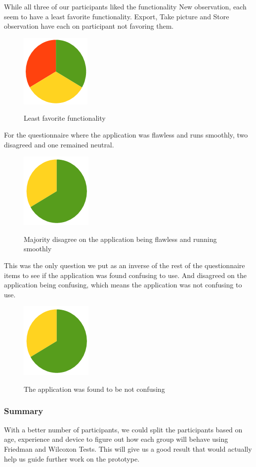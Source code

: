 While all three of our participants liked the functionality New observation, each seem to have a least favorite functionality. Export, Take picture and Store observation have each on participant not favoring them.
\newpage
\begin{figure}[htb]
    \centering
    \includegraphics[scale=0.8]{ut_pic/Functionalitydislike.png}
    \label{Functionality favourability}
    \caption{Least favorite functionality}
\end{figure}

For the questionnaire where the application was flawless and runs smoothly, two disagreed and one remained neutral.
\begin{figure}[htb]
    \centering
    \includegraphics[scale=0.8]{ut_pic/flawless.png}
    \label{App was flawless}
    \caption{Majority disagree on the application being flawless and running smoothly}
\end{figure}

This was the only question we put as an inverse of the rest of the questionnaire items to see if the application was found confusing to use. And disagreed on the application being confusing, which means the application was not confusing to use.

\begin{figure}[htb]
    \centering
    \includegraphics[scale=0.8]{ut_pic/flawless.png}
    \label{App was confusing to use}
    \caption{The application was found to be not confusing}
\end{figure}

\subsubsection{Summary}
With a better number of participants, we could split the participants based on age, experience and device to figure out how each group will behave using Friedman\cite{Friedman} and Wilcoxon\cite{Wilcoxon} Tests. This will give us a good result that would actually help us guide further work on the prototype.

